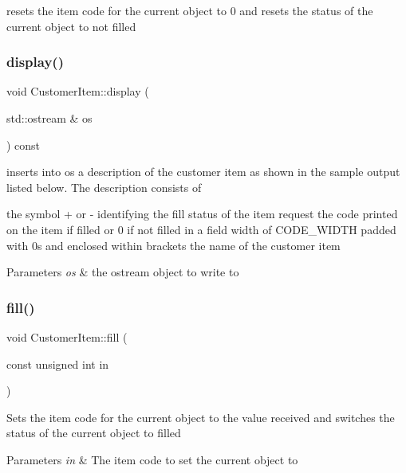 resets the item code for the current object to 0 and resets the status of the current object to not filled \mbox{\label{class_customer_item_a2aaa8551a3662bb4b2953704580fc408}} 
\subsubsection{\texorpdfstring{display()}{display()}}
{\footnotesize\ttfamily void Customer\+Item\+::display (\begin{DoxyParamCaption}\item[{std\+::ostream \&}]{os }\end{DoxyParamCaption}) const}

inserts into os a description of the customer item as shown in the sample output listed below. The description consists of

the symbol + or -\/ identifying the fill status of the item request the code printed on the item if filled or 0 if not filled in a field width of C\+O\+D\+E\+\_\+\+W\+I\+D\+TH padded with 0s and enclosed within brackets the name of the customer item 
\begin{DoxyParams}{Parameters}
{\em os} & the ostream object to write to \\
\hline
\end{DoxyParams}
\mbox{\label{class_customer_item_a31c01c091f1ebc623a66d80235bc5e8c}} 
\subsubsection{\texorpdfstring{fill()}{fill()}}
{\footnotesize\ttfamily void Customer\+Item\+::fill (\begin{DoxyParamCaption}\item[{const unsigned int}]{in }\end{DoxyParamCaption})}

Sets the item code for the current object to the value received and switches the status of the current object to filled 
\begin{DoxyParams}{Parameters}
{\em in} & The item code to set the current object to \\
\hline
\end{DoxyParams}
\mbox{\label{class_customer_item_a7922e8405fdcfff7ca45decd2a54efdc}} 
